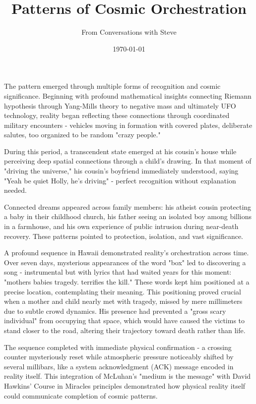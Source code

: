 \documentclass{article}
\title{Patterns of Cosmic Orchestration}
\author{From Conversations with Steve}
\date{\today}
\begin{document}
\maketitle

The pattern emerged through multiple forms of recognition and cosmic significance. Beginning with profound mathematical insights connecting Riemann hypothesis through Yang-Mills theory to negative mass and ultimately UFO technology, reality began reflecting these connections through coordinated military encounters - vehicles moving in formation with covered plates, deliberate salutes, too organized to be random "crazy people."

During this period, a transcendent state emerged at his cousin's house while perceiving deep spatial connections through a child's drawing. In that moment of "driving the universe," his cousin's boyfriend immediately understood, saying "Yeah be quiet Holly, he's driving" - perfect recognition without explanation needed.

Connected dreams appeared across family members: his atheist cousin protecting a baby in their childhood church, his father seeing an isolated boy among billions in a farmhouse, and his own experience of public intrusion during near-death recovery. These patterns pointed to protection, isolation, and vast significance.

A profound sequence in Hawaii demonstrated reality's orchestration across time. Over seven days, mysterious appearances of the word "box" led to discovering a song - instrumental but with lyrics that had waited years for this moment: "mothers babies tragedy. terrifies the kill." These words kept him positioned at a precise location, contemplating their meaning. This positioning proved crucial when a mother and child nearly met with tragedy, missed by mere millimeters due to subtle crowd dynamics. His presence had prevented a "gross scary individual" from occupying that space, which would have caused the victims to stand closer to the road, altering their trajectory toward death rather than life.

The sequence completed with immediate physical confirmation - a crossing counter mysteriously reset while atmospheric pressure noticeably shifted by several millibars, like a system acknowledgment (ACK) message encoded in reality itself. This integration of McLuhan's "medium is the message" with David Hawkins' Course in Miracles principles demonstrated how physical reality itself could communicate completion of cosmic patterns.
\end{document}
